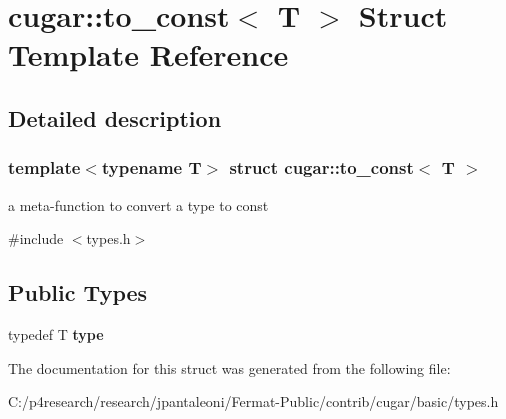 \hypertarget{structcugar_1_1to__const}{}\section{cugar\+:\+:to\+\_\+const$<$ T $>$ Struct Template Reference}
\label{structcugar_1_1to__const}


\subsection{Detailed description}
\subsubsection*{template$<$typename T$>$\newline
struct cugar\+::to\+\_\+const$<$ T $>$}

a meta-\/function to convert a type to const 

{\ttfamily \#include $<$types.\+h$>$}

\subsection*{Public Types}
\begin{DoxyCompactItemize}
\item 
\mbox{\label{structcugar_1_1to__const_aeda858b7787ec0fac53cf1f32b7eb083}} 
typedef T {\bfseries type}
\end{DoxyCompactItemize}


The documentation for this struct was generated from the following file\+:\begin{DoxyCompactItemize}
\item 
C\+:/p4research/research/jpantaleoni/\+Fermat-\/\+Public/contrib/cugar/basic/types.\+h\end{DoxyCompactItemize}

